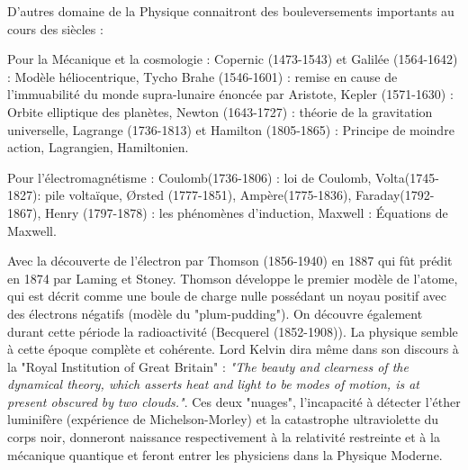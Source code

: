 D'autres domaine de la Physique connaitront des bouleversements importants au cours des siècles : 

Pour la Mécanique et la cosmologie : Copernic (1473-1543) et Galilée (1564-1642) : Modèle héliocentrique, Tycho Brahe (1546-1601) : remise en cause de  l'immuabilité du monde supra-lunaire énoncée par Aristote, Kepler (1571-1630) : Orbite elliptique des planètes, Newton (1643-1727) : théorie de la gravitation universelle, Lagrange (1736-1813) et Hamilton (1805-1865) : Principe de moindre action, Lagrangien, Hamiltonien.

Pour l'électromagnétisme : Coulomb(1736-1806) : loi de Coulomb, Volta(1745-1827): pile voltaïque, Ørsted (1777-1851), Ampère(1775-1836), Faraday(1792-1867), Henry (1797-1878) : les phénomènes d'induction, Maxwell : Équations de Maxwell.

Avec la découverte de l'électron par Thomson (1856-1940) en 1887 qui fût prédit en 1874 par Laming et Stoney. Thomson développe le premier modèle de l'atome, qui est décrit comme une boule de charge nulle possédant un noyau positif avec des électrons négatifs (modèle du "plum-pudding"). On découvre également durant cette période la radioactivité (Becquerel (1852-1908)). La physique semble à cette époque complète et cohérente. Lord Kelvin dira même dans son discours à la "Royal Institution of Great Britain" : \textit{"The beauty and clearness of the dynamical theory, which asserts heat and light to be modes of motion, is at present obscured by two clouds."}. Ces deux "nuages", l'incapacité à détecter l'éther luminifère  (expérience de Michelson-Morley) et la catastrophe ultraviolette du corps noir, donneront naissance respectivement à la relativité restreinte et à la mécanique quantique et feront entrer les physiciens dans la Physique Moderne.

